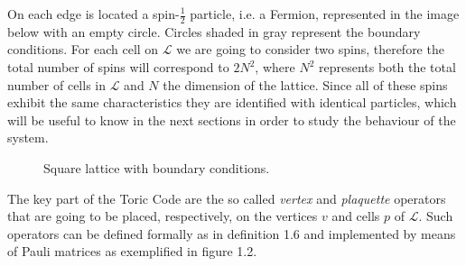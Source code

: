 \documentclass{Configuration_Files/PoliMi3i_thesis}
\begin{document}
On each edge is located a spin-$\frac{1}{2}$ particle, i.e. a Fermion, represented in the image below with an empty circle. Circles shaded in gray represent the boundary conditions. 
For each cell on $\mathcal{L}$ we are going to consider two spins, therefore the total number of spins will correspond to $2N^2$, where $N^2$ represents both the total number of cells in $\mathcal{L}$ and $N$ the dimension of the lattice. 
Since all of these spins exhibit the same characteristics they are identified with identical particles, which will be useful to know in the next sections in order to study the behaviour of the system.

\begin{figure}[b]
	\begin{center}
	\end{center}
	
	\caption{Square lattice with boundary conditions.}
	\label{fig:lattice}
\end{figure}

\newpage
The key part of the Toric Code are the so called \textit{vertex} and \textit{plaquette} operators that are going to be placed, respectively, on the vertices $v$ and cells $p$ of $\mathcal{L}$. Such operators can be defined formally as in definition 1.6 and implemented by means of Pauli matrices as exemplified in figure 1.2. 
\end{document}
